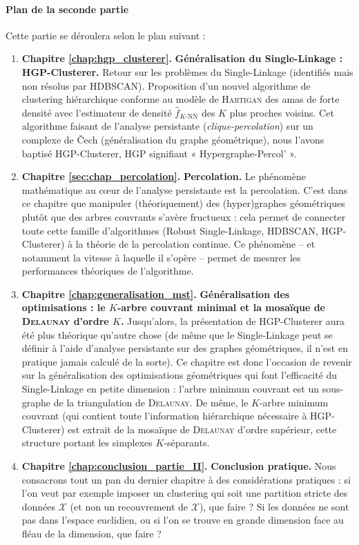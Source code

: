 \documentclass{these-ISSS} %
\begin{document}
\paragraph{Plan de la seconde partie}
Cette partie se déroulera selon le plan suivant :
\begin{enumerate}
    \item \textbf{Chapitre \ref{chap:hgp_clusterer}.} \textbf{Généralisation du Single-Linkage : HGP-Clusterer.} Retour sur les problèmes du Single-Linkage (identifiés mais non résolus par HDBSCAN). Proposition d'un nouvel algorithme de clustering hiérarchique conforme au modèle de \textsc{Hartigan} des amas de forte densité avec l'estimateur de densité $\widehat f_{K\text{-NN}}$ des $K$ plus proches voisins. Cet algorithme faisant de l'analyse persistante (\emph{clique-percolation}) sur un complexe de \v Cech (généralisation du graphe géométrique), nous l'avons baptisé HGP-Clusterer, HGP signifiant « Hypergraphe-Percol' ».
    \item \textbf{Chapitre \ref{sec:chap_percolation}.} \textbf{Percolation.} Le phénomène mathématique au cœur de l'analyse persistante est la percolation. C'est dans ce chapitre que manipuler (théoriquement) des (hyper)graphes géométriques plutôt que des arbres couvrants s'avère fructueux : cela permet de connecter toute cette famille d'algorithmes (Robust Single-Linkage, HDBSCAN, HGP-Clusterer) à la théorie de la percolation continue. Ce phénomène -- et notamment la vitesse à laquelle il s'opère -- permet de mesurer les performances théoriques de l'algorithme.
    \item \textbf{Chapitre \ref{chap:generalisation_mst}.} \textbf{Généralisation des optimisations : le $K$-arbre couvrant minimal et la mosaïque de \textsc{Delaunay} d'ordre $K$.} 
    Jusqu'alors, la présentation de HGP-Clusterer aura été plus théorique qu'autre chose (de même que le Single-Linkage peut se définir à l'aide d'analyse persistante sur des graphes géométriques, il n'est en pratique jamais calculé de la sorte). Ce chapitre est donc l'occasion de revenir sur la généralisation des optimisations géométriques qui font l'efficacité du Single-Linkage en petite dimension : l'arbre minimum couvrant est un sous-graphe de la triangulation de \textsc{Delaunay}. De même, le $K$-arbre minimum couvrant (qui contient toute l'information hiérarchique nécessaire à HGP-Clusterer) est extrait de la mosaïque de \textsc{Delaunay} d'ordre supérieur, cette structure portant les simplexes $K$-séparants.
    \item \textbf{Chapitre \ref{chap:conclusion_partie_II}.} \textbf{Conclusion pratique.} Nous consacrons tout un pan du dernier chapitre à des considérations pratiques : si l'on veut par exemple imposer un clustering qui soit une partition stricte des données $\mathcal X$ (et non un recouvrement de $\mathcal X$), que faire ? Si les données ne sont pas dans l'espace euclidien, ou si l'on se trouve en grande dimension face au fléau de la dimension, que faire ? 


\end{enumerate}
\end{document}
